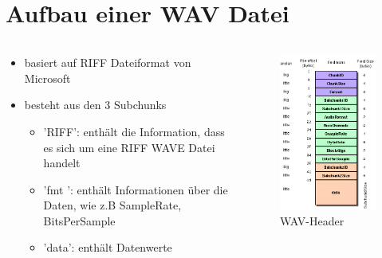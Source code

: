 \section{Aufbau einer WAV Datei}
\begin{frame}{\insertsection}
	\begin{columns}[T]
		\begin{column}{0.6\textwidth}
			\vspace{1em}
			\begin{itemize}
				\item basiert auf RIFF Dateiformat von Microsoft
				\item besteht aus den $3$ Subchunks
				\begin{itemize}
					\item 'RIFF': enthält die Information, dass es sich um eine RIFF WAVE Datei handelt \vspace{0.25em}
					\item 'fmt ': enthält Informationen über die Daten, wie z.B SampleRate, BitsPerSample \vspace{0.25em}
					\item 'data': enthält Datenwerte
				\end{itemize}
			\end{itemize}
		\end{column}
		\hfill
		\begin{column}{0.4\textwidth}
			\begin{figure}
				\includegraphics[scale=0.4]{images/wav-header.png}
				\caption{\centering \scriptsize WAV-Header\footnotemark[\thefootnote]}
			\end{figure}
		\end{column}
	\end{columns}
\end{frame}


